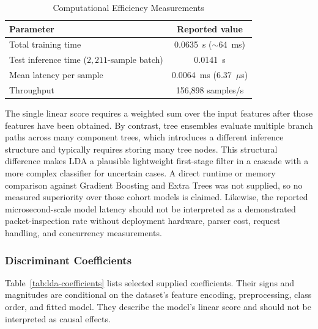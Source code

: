 \documentclass[conference]{IEEEtran}
\begin{document}
\begin{table}[!t]
\caption{Computational Efficiency Measurements}
\label{tab:lda-efficiency}
\centering
\footnotesize
\begin{tabular}{lc}
\toprule
\textbf{Parameter} & \textbf{Reported value}\\
\midrule
Total training time & 0.0635~s ($\sim$64~ms)\\
Test inference time ($2{,}211$-sample batch) & 0.0141~s\\
Mean latency per sample & 0.0064~ms (6.37~$\mu$s)\\
Throughput & 156,898 samples/s\\
\bottomrule
\end{tabular}
\end{table}

The single linear score requires a weighted sum over the input features after those features have been obtained. By contrast, tree ensembles evaluate multiple branch paths across many component trees, which introduces a different inference structure and typically requires storing many tree nodes. This structural difference makes LDA a plausible lightweight first-stage filter in a cascade with a more complex classifier for uncertain cases. A direct runtime or memory comparison against Gradient Boosting and Extra Trees was not supplied, so no measured superiority over those cohort models is claimed. Likewise, the reported microsecond-scale model latency should not be interpreted as a demonstrated packet-inspection rate without deployment hardware, parser cost, request handling, and concurrency measurements.

\subsubsection{Discriminant Coefficients}
Table~\ref{tab:lda-coefficients} lists selected supplied coefficients. Their signs and magnitudes are conditional on the dataset's feature encoding, preprocessing, class order, and fitted model. They describe the model's linear score and should not be interpreted as causal effects.
\end{document}
